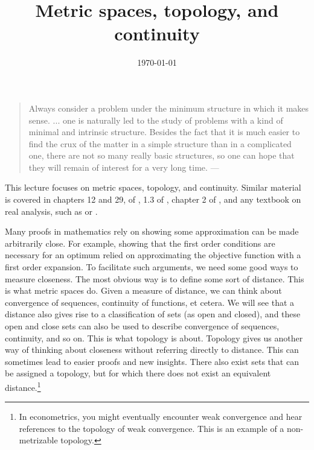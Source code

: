  


\title{Metric spaces, topology, and continuity}
\date{\today}



\maketitle

\begin{quotation}
  Always consider a problem under the minimum structure in which it
  makes sense. ... one is naturally led to the study of problems with
  a kind of minimal and intrinsic structure. Besides the fact that it
  is much easier to find the crux of the matter in a simple structure
  than in a complicated one, there are not so many really basic
  structures, so one can hope that they will remain of interest for a
  very long time. --- \cite{talagrand2005}
\end{quotation}

This lecture focuses on metric spaces, topology, and continuity.
Similar material is covered in chapters 12 and 29, of \cite{sb1994},
1.3 of \cite{carter2001}, chapter 2 of \cite{fuente2000}, and any
textbook on real analysis, such as \cite{rudin1976} or \cite{tao2006}.

Many proofs in mathematics rely on showing some approximation can be
made arbitrarily close. For example, showing that the first order
conditions are necessary for an optimum relied on approximating the
objective function with a first order expansion. To facilitate such
arguments, we need some good ways to measure closeness. The most
obvious way is to define some sort of distance. This is what metric
spaces do. Given a measure of distance, we can think about convergence
of sequences, continuity of functions, et cetera. We will see that a
distance also gives rise to a classification of sets (as open and
closed), and these open and close sets can also be used to describe
convergence of sequences, continuity, and so on. This is what topology
is about. Topology gives us another way of thinking about closeness
without referring directly to distance. This can sometimes lead to
easier proofs and new insights. There also exist sets that can be
assigned a topology, but for which there does not 
exist an equivalent distance.\footnote{In econometrics, you might
  eventually encounter weak convergence and hear references to the
  topology of weak convergence. This is an example of a non-metrizable
  topology.} 

